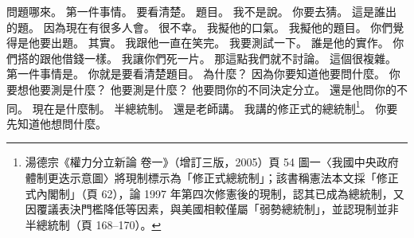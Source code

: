 \hypertarget{c01:cue:3611}{}問題哪來。
\hypertarget{c01:cue:3612}{}第一件事情。
\hypertarget{c01:cue:3613}{}要看清楚。
\hypertarget{c01:cue:3614}{}題目。
\hypertarget{c01:cue:3615}{}我不是說。
\hypertarget{c01:cue:3616}{}你要去猜。
\hypertarget{c01:cue:3617}{}這是誰出的題。
\hypertarget{c01:cue:3618}{}因為現在有很多人會。
\hypertarget{c01:cue:3619}{}很不幸。
\hypertarget{c01:cue:3620}{}我擬他的口氣。
\hypertarget{c01:cue:3621}{}我擬他的題目。
\hypertarget{c01:cue:3622}{}你們覺得是他要出題。
\hypertarget{c01:cue:3623}{}其實。
\hypertarget{c01:cue:3624}{}我跟他一直在笑完。
\hypertarget{c01:cue:3625}{}我要測試一下。
\hypertarget{c01:cue:3626}{}誰是他的實作。
\hypertarget{c01:cue:3627}{}你們搭的跟他借錢一樣。
\hypertarget{c01:cue:3628}{}我讓你們死一片。
\hypertarget{c01:cue:3629}{}那這點我們就不討論。
\hypertarget{c01:cue:3630}{}這個很複雜。
\hypertarget{c01:cue:3631}{}第一件事情是。
\hypertarget{c01:cue:3632}{}你就是要看清楚題目。
\hypertarget{c01:cue:3633}{}為什麼？
\hypertarget{c01:cue:3634}{}因為你要知道他要問什麼。
\hypertarget{c01:cue:3635}{}你要想他要測是什麼？
\hypertarget{c01:cue:3636}{}他要測是什麼？
\hypertarget{c01:cue:3637}{}他要問你的不同決定分立。
\hypertarget{c01:cue:3638}{}還是他問你的不同。
\hypertarget{c01:cue:3639}{}現在是什麼制。
\hypertarget{c01:cue:3640}{}半總統制。
\hypertarget{c01:cue:3641}{}還是老師講。
\hypertarget{c01:cue:3642}{}我講的修正式的總統制\footnote{湯德宗《權力分立新論 卷一》（增訂三版，2005）頁 54 圖一〈我國中央政府體制更迭示意圖〉將現制標示為「修正式總統制」；該書稱憲法本文採「修正式內閣制」（頁 62），論 1997 年第四次修憲後的現制，認其已成為總統制，又因覆議表決門檻降低等因素，與美國相較僅屬「弱勢總統制」，並認現制並非半總統制（頁 168–170）。}。
\hypertarget{c01:cue:3643}{}你要先知道他想問什麼。


